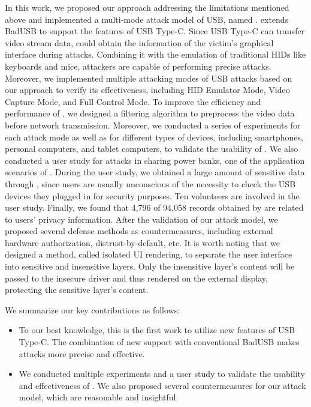 In this work, we proposed our approach addressing the limitations mentioned
above and implemented a multi-mode attack model of \ac{USB}, named \tool.  \tool
extends BadUSB to support the features of \ac{USB} Type-C.  Since \ac{USB} Type-C can transfer video stream data, \tool could obtain the information of the
victim's graphical interface during attacks.  Combining it with the emulation
of traditional \acp{HID} like keyboards and mice, attackers are capable of
performing precise attacks.  
Moreover, we implemented multiple attacking
modes of \ac{USB} attacks based on our approach to verify its effectiveness,
including \ac{HID} Emulator Mode, Video Capture Mode, and Full Control Mode.  To improve the
efficiency and performance of \tool, we designed a filtering algorithm to
preprocess the video data before network transmission.  Moreover, we conducted
a series of experiments for each attack mode as well as for different types of
devices, including smartphones, personal computers, and tablet computers, to
validate the usability of \tool.  We also conducted a user study for attacks in
sharing power banks, one of the application scenarios of \tool.  During the
user study, we obtained a large amount of sensitive data through \tool, since
users are usually unconscious of the necessity to check the \ac{USB} devices they
plugged in for security purposes.  
Ten volunteers are involved in the user study.
Finally, we found that 4,796 of 94,058 records obtained by \tool are related to users' privacy information.
After the validation of our attack model, we
proposed several defense methods as countermeasures, including external
hardware authorization, distrust-by-default, etc.  It is worth noting that we
designed a method, called isolated \ac{UI} rendering, to separate the user interface
into sensitive and insensitive layers.  Only the insensitive layer's content will be passed to the insecure driver and thus rendered on the external display, protecting the sensitive layer's content.

We summarize our key contributions as follows:

\begin{itemize} 
    
    \item To our best knowledge, this is the first work to utilize new features
	of \ac{USB} Type-C.  The combination of new support with conventional BadUSB
	makes attacks more precise and effective.
	
	
    \item We conducted multiple experiments and a user study to validate the
	usability and effectiveness of \tool.  We also proposed several
	countermeasures for our attack model, which are reasonable and
	insightful. 
\end{itemize}


